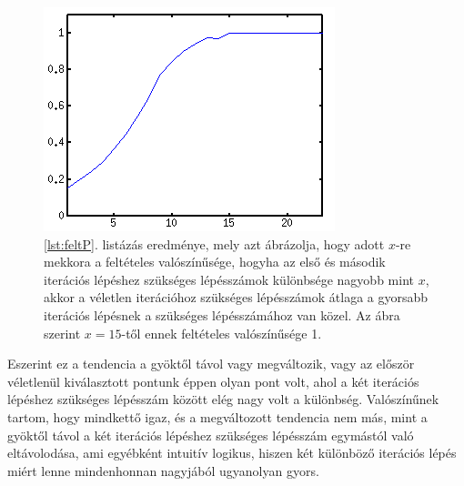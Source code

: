 \documentclass[a4paper,12pt]{report}
\begin{document}
                \begin{figure}[h]
					\centering
					\includegraphics[scale=0.7]{feltP.png}
					\caption{\ref{lst:feltP}. listázás eredménye, mely azt ábrázolja, hogy adott $x$-re mekkora a feltételes valószínűsége, hogyha az első és második iterációs lépéshez szükséges lépésszámok különbsége nagyobb mint $x$, akkor a véletlen iterációhoz szükséges lépésszámok átlaga a gyorsabb iterációs lépésnek a szükséges lépésszámához van közel. Az ábra szerint $x=15$-től ennek feltételes valószínűsége 1.}
				\end{figure}
				
				Eszerint ez a tendencia a gyöktől távol vagy megváltozik, vagy az először véletlenül kiválasztott pontunk éppen olyan pont volt, ahol a két iterációs lépéshez szükséges lépésszám között elég nagy volt a különbség. Valószínűnek tartom, hogy mindkettő igaz, és a megváltozott tendencia nem más, mint a gyöktől távol a két iterációs lépéshez szükséges lépésszám egymástól való eltávolodása, ami egyébként intuitív logikus, hiszen két különböző iterációs lépés miért lenne mindenhonnan nagyjából ugyanolyan gyors. 











\end{document}
